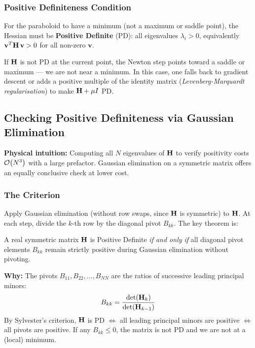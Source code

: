 \subsubsection{Positive Definiteness Condition}
For the paraboloid to have a minimum (not a maximum or saddle point), the
Hessian must be \textbf{Positive Definite} (PD): all eigenvalues
$\lambda_i > 0$, equivalently $\mathbf{v}^T\mathbf{H}\,\mathbf{v} > 0$ for all
non-zero $\mathbf{v}$.

If $\mathbf{H}$ is not PD at the current point, the Newton step points toward a
saddle or maximum — we are not near a minimum. In this case, one falls back
to gradient descent or adds a positive multiple of the identity matrix
(\emph{Levenberg-Marquardt regularisation}) to make $\mathbf{H} + \mu I$ PD.

\subsection{Checking Positive Definiteness via Gaussian Elimination}

\noindent\textbf{Physical intuition:} Computing all $N$ eigenvalues of $\mathbf{H}$
to verify positivity costs $\mathcal{O}\!\left(N^3\right)$ with a large prefactor. Gaussian
elimination on a symmetric matrix offers an equally conclusive check at lower
cost.

\subsubsection{The Criterion}
Apply Gaussian elimination (without row swaps, since $\mathbf{H}$ is symmetric)
to $\mathbf{H}$. At each step, divide the $k$-th row by the diagonal pivot
$B_{kk}$. The key theorem is:

\begin{tcolorbox}[colback=blue!5!white,colframe=blue!75!black,
  title=Positive Definiteness via Gaussian Elimination]
A real symmetric matrix $\mathbf{H}$ is Positive Definite \emph{if and only if}
all diagonal pivot elements $B_{kk}$ remain strictly positive during
Gaussian elimination without pivoting.

\textbf{Why:} The pivots $B_{11}, B_{22}, \ldots, B_{NN}$ are the ratios of
successive leading principal minors:
\[
B_{kk} = \frac{\det(\mathbf{H}_k)}{\det(\mathbf{H}_{k-1})}
\]
By Sylvester's criterion, $\mathbf{H}$ is PD $\iff$ all leading principal minors
are positive $\iff$ all pivots are positive. If any $B_{kk} \leq 0$, the
matrix is not PD and we are not at a (local) minimum.
\end{tcolorbox}

